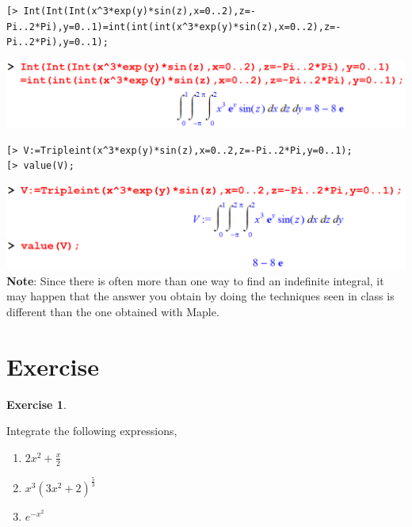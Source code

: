 \documentclass[
]{book}
\providecommand{\tightlist}{%
  \setlength{\itemsep}{0pt}\setlength{\parskip}{0pt}}
\theoremstyle{definition}
\theoremstyle{definition}
\theoremstyle{definition}
\newtheorem{exercise}{Exercise}[chapter]
\theoremstyle{definition}
\theoremstyle{remark}
\begin{document}
\begin{verbatim}
[> Int(Int(Int(x^3*exp(y)*sin(z),x=0..2),z=-Pi..2*Pi),y=0..1)=int(int(int(x^3*exp(y)*sin(z),x=0..2),z=-Pi..2*Pi),y=0..1);
\end{verbatim}

\includegraphics{figures/Lesson 6/fig26.png}

\begin{verbatim}
[> V:=Tripleint(x^3*exp(y)*sin(z),x=0..2,z=-Pi..2*Pi,y=0..1);
[> value(V);
\end{verbatim}

\includegraphics{figures/Lesson 6/fig27.png}
\textbf{Note}: Since there is often more than one way to find an indefinite integral, it may happen that the answer you obtain by doing the techniques seen in class is different than the one obtained with Maple.

\section{Exercise}\label{exercise-6}

\begin{exercise}
\protect\hypertarget{exr:unnamed-chunk-30}{}\label{exr:unnamed-chunk-30}

Integrate the following expressions,

\begin{enumerate}
\def\labelenumi{\roman{enumi}.}
\tightlist
\item
  \(2x^2 + \frac{x}{2}\)
\item
  \(x^3(3x^2 + 2)^{\frac{5}{3}}\)
\item
  \(e^{-x^2}\)
\end{enumerate}

\end{exercise}
\end{document}
